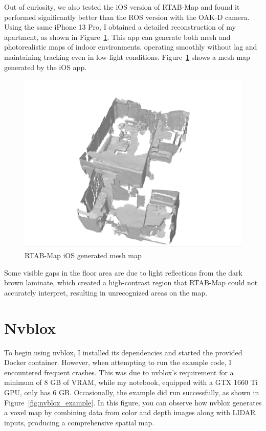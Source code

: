 Out of curiosity, we also tested the iOS version of RTAB-Map and found it performed significantly better than the ROS version with the OAK-D camera. Using the same iPhone 13 Pro, I obtained a detailed reconstruction of my apartment, as shown in Figure~\ref{fig:rtabmap_ios}. This app can generate both mesh and photorealistic maps of indoor environments, operating smoothly without lag and maintaining tracking even in low-light conditions. Figure~\ref{fig:rtabmap_ios} shows a mesh map generated by the iOS app.

\begin{figure}[htbp]
	\centering
	\includegraphics[width=150mm, keepaspectratio]{figures/rtabmap_ios.png}
	\caption{RTAB-Map iOS generated mesh map}
	\label{fig:rtabmap_ios}
\end{figure}
\FloatBarrier

Some visible gaps in the floor area are due to light reflections from the dark brown laminate, which created a high-contrast region that RTAB-Map could not accurately interpret, resulting in unrecognized areas on the map.


\section{Nvblox}

To begin using nvblox, I installed its dependencies and started the provided Docker container. However, when attempting to run the example code, I encountered frequent crashes. This was due to nvblox’s requirement for a minimum of 8 GB of VRAM, while my notebook, equipped with a GTX 1660 Ti GPU, only has 6 GB. Occasionally, the example did run successfully, as shown in Figure~\ref{fig:nvblox_example}. In this figure, you can observe how nvblox generates a voxel map by combining data from color and depth images along with LIDAR inputs, producing a comprehensive spatial map.

